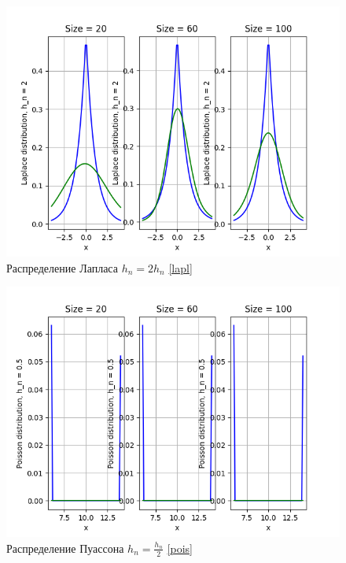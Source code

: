 \documentclass[a4paper]{article}
\begin{document}
        \begin{figure}[H]
            \centering
            \includegraphics[scale = 0.4]{Laplace distribution, h_n = 2.png}
            \caption{Распределение Лапласа $h_n = 2 h_n$ \eqref{lapl}}
            \label{fig:cauchy}
        \end{figure}
        
        \begin{figure}[H]
            \centering
            \includegraphics[scale = 0.4]{Poisson distribution, h_n = 0.5.png}
            \caption{Распределение Пуассона $h_n = \frac{h_n}{2}$ \eqref{pois}}
            \label{fig:cauchy}
        \end{figure}
        
\end{document}
